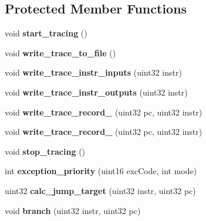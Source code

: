 \subsection*{Protected Member Functions}
\begin{DoxyCompactItemize}
\item 
\hypertarget{classCPU_ac7b1309543175ded1def959bee53bf5f}{
void {\bfseries start\_\-tracing} ()}
\label{classCPU_ac7b1309543175ded1def959bee53bf5f}

\item 
\hypertarget{classCPU_acd376de653b6c7bbf81fc3bb0e359563}{
void {\bfseries write\_\-trace\_\-to\_\-file} ()}
\label{classCPU_acd376de653b6c7bbf81fc3bb0e359563}

\item 
\hypertarget{classCPU_a16485b63e1e7ebf2344cf7f6f959f0ae}{
void {\bfseries write\_\-trace\_\-instr\_\-inputs} (uint32 instr)}
\label{classCPU_a16485b63e1e7ebf2344cf7f6f959f0ae}

\item 
\hypertarget{classCPU_afbaf48c07fa50fbe34921ae1d8fd1330}{
void {\bfseries write\_\-trace\_\-instr\_\-outputs} (uint32 instr)}
\label{classCPU_afbaf48c07fa50fbe34921ae1d8fd1330}

\item 
\hypertarget{classCPU_ac27e6471c16b2ef8db492741c378027d}{
void {\bfseries write\_\-trace\_\-record\_} (uint32 pc, uint32 instr)}
\label{classCPU_ac27e6471c16b2ef8db492741c378027d}

\item 
\hypertarget{classCPU_ad4a6a675396f2e28d2ba597db7a046bb}{
void {\bfseries write\_\-trace\_\-record\_} (uint32 pc, uint32 instr)}
\label{classCPU_ad4a6a675396f2e28d2ba597db7a046bb}

\item 
\hypertarget{classCPU_a4e7a051007781885d65efa15f178f04c}{
void {\bfseries stop\_\-tracing} ()}
\label{classCPU_a4e7a051007781885d65efa15f178f04c}

\item 
\hypertarget{classCPU_a3f626e9294073c7863592d0dc701556e}{
int {\bfseries exception\_\-priority} (uint16 excCode, int mode)}
\label{classCPU_a3f626e9294073c7863592d0dc701556e}

\item 
\hypertarget{classCPU_a634b14f9cd44bb7d9cdafe47944a354c}{
uint32 {\bfseries calc\_\-jump\_\-target} (uint32 instr, uint32 pc)}
\label{classCPU_a634b14f9cd44bb7d9cdafe47944a354c}

\item 
\hypertarget{classCPU_a3a8fb342dcef449afe2b7ee20841baf2}{
void {\bfseries branch} (uint32 instr, uint32 pc)}
\label{classCPU_a3a8fb342dcef449afe2b7ee20841baf2}


\end{DoxyCompactItemize}
